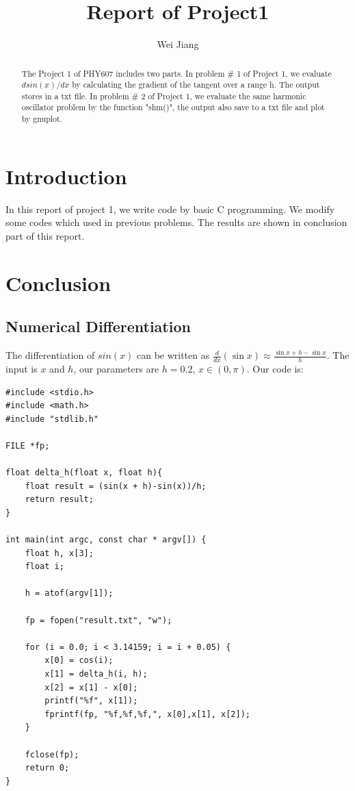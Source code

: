 \documentclass{article}
\begin{document}
\title{Report of Project1}
\author{Wei Jiang}

\maketitle

\begin{abstract}
The Project 1 of PHY607 includes two parts.
In problem \# 1 of Project 1, we evaluate $d sin(x)/dx$ by calculating the gradient of the tangent over a range h. The output stores in a txt file.
In problem \# 2 of Project 1, we evaluate the same harmonic oscillator problem by the function "shm()", the output also save to a txt file and plot by gnuplot.
\end{abstract}



\section{Introduction}

In this report of project 1, we write code by basic C programming. We modify some codes which used in previous problems. The results are shown in conclusion part of this report.


\section{Conclusion}

\subsection{Numerical Differentiation}

The differentiation of $sin(x)$ can be written as $\frac{d}{dx}(\sin{x}) \approx \frac{\sin{x+h}-\sin{x}}{h}$. The input is $x$ and $h$, our parameters are
$h=0.2$, $x \in (0, \pi)$. Our code is:

\begin{lstlisting}
#include <stdio.h>
#include <math.h>
#include "stdlib.h"

FILE *fp;

float delta_h(float x, float h){
    float result = (sin(x + h)-sin(x))/h;
    return result;
}

int main(int argc, const char * argv[]) {
    float h, x[3];
    float i;
    
    h = atof(argv[1]);
    
    fp = fopen("result.txt", "w");
    
    for (i = 0.0; i < 3.14159; i = i + 0.05) {
        x[0] = cos(i);
        x[1] = delta_h(i, h);
        x[2] = x[1] - x[0];
        printf("%f", x[1]);
        fprintf(fp, "%f,%f,%f,", x[0],x[1], x[2]);
    }
    
    fclose(fp);
    return 0;
}
\end{lstlisting}
\end{document}
